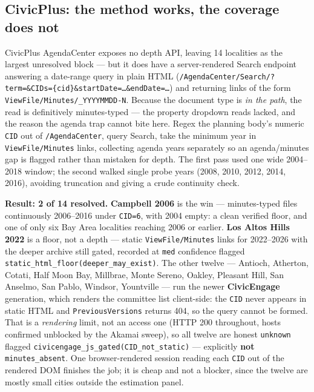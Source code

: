 \documentclass[11pt]{article}
\begin{document}
\subsection{CivicPlus: the method works, the coverage does not}

CivicPlus AgendaCenter exposes no depth API, leaving 14 localities as the largest unresolved
block --- but it does have a server-rendered Search endpoint answering a date-range query in plain
HTML (\texttt{/AgendaCenter/Search/?term=\&CIDs=\{cid\}\&startDate=\dots\&endDate=\dots}) and
returning links of the form \texttt{ViewFile/Minutes/\_YYYYMMDD-N}. Because the document type is
\emph{in the path}, the read is definitively minutes-typed --- the property dropdown reads lacked,
and the reason the agenda trap cannot bite here. Regex the planning body's numeric \texttt{CID}
out of \texttt{/AgendaCenter}, query Search, take the minimum year in \texttt{ViewFile/Minutes}
links, collecting agenda years separately so an agenda/minutes gap is flagged rather than mistaken
for depth. The first pass used one wide 2004--2018 window; the second walked single probe years
(2008, 2010, 2012, 2014, 2016), avoiding truncation and giving a crude continuity check.

\textbf{Result: 2 of 14 resolved.} \textbf{Campbell 2006} is the win --- minutes-typed files
continuously 2006--2016 under \texttt{CID=6}, with 2004 empty: a clean verified floor, and one of
only six Bay Area localities reaching 2006 or earlier. \textbf{Los Altos Hills 2022} is a floor,
not a depth --- static \texttt{ViewFile/Minutes} links for 2022--2026 with the deeper archive
still gated, recorded at \texttt{med} confidence flagged
\texttt{static\_html\_floor(deeper\_may\_exist)}. The other twelve --- Antioch, Atherton, Cotati,
Half Moon Bay, Millbrae, Monte Sereno, Oakley, Pleasant Hill, San Anselmo, San Pablo, Windsor,
Yountville --- run the newer \textbf{CivicEngage} generation, which renders the committee list
client-side: the \texttt{CID} never appears in static HTML and \texttt{PreviousVersions} returns
404, so the query cannot be formed. That is a \emph{rendering} limit, not an access one (HTTP 200
throughout, hosts confirmed unblocked by the Akamai sweep), so all twelve are honest
\texttt{unknown} flagged \texttt{civicengage\_js\_gated(CID\_not\_static)} --- explicitly
\textbf{not} \texttt{minutes\_absent}. One browser-rendered session reading each \texttt{CID} out
of the rendered DOM finishes the job; it is cheap and not a blocker, since the twelve are mostly
small cities outside the estimation panel.
\end{document}
